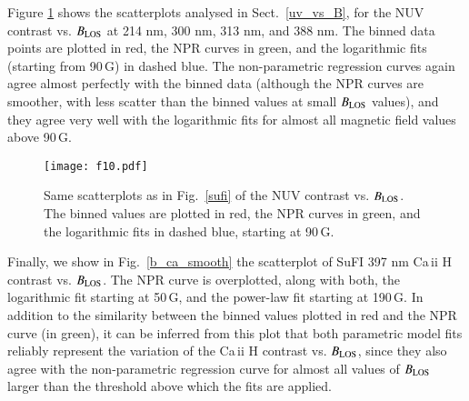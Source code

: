 \documentclass[goettingen, gauss, print]{thesis}
\begin{document}
Figure \ref{sufi_nonparam} shows the scatterplots analysed in Sect.~\ref{uv_vs_B}, for the NUV contrast vs. $B_{\rm LOS}$ at 214 nm, 300 nm, 313 nm, and 388 nm. The binned data points are plotted in red, the NPR curves in green, and the logarithmic fits (starting from 90\,G) in dashed blue.
The non-parametric regression curves again agree almost perfectly with the binned data (although the NPR curves are smoother, with less scatter than the binned values at small $B_{\rm LOS}$ values), and they agree very well with the logarithmic fits for almost all magnetic field values above 90\,G.\\

\begin{figure*}
\centering
\texttt{[image: f10.pdf]}
\caption{Same scatterplots as in Fig.~\ref{sufi} of the NUV contrast vs. $B_{\rm LOS}$. The binned values are plotted in red, the NPR curves in green, and the logarithmic fits in dashed blue, starting at 90\,G.}
\label{sufi_nonparam}
\end{figure*}


Finally, we show in Fig.~\ref{b_ca_smooth} the scatterplot of SuFI 397 nm Ca\,{\sc ii} H contrast vs. $B_{\rm LOS}$. The NPR curve is overplotted, along with both, the logarithmic fit starting at 50\,G, and the power-law fit starting at 190\,G. In addition to the similarity between the binned values plotted in red and the NPR curve (in green), it can be inferred from this plot that both parametric model fits reliably represent the variation of the Ca\,{\sc ii} H contrast vs. $B_{\rm LOS}$, since they also agree with the non-parametric regression curve for almost all values of $B_{\rm LOS}$ larger than the threshold above which the fits are applied.\\                                                                                                                                                                                                                                                                                                                                                                                                                                                                                                                                                                                                                                                                                                                                                                                                                                              
\end{document}
